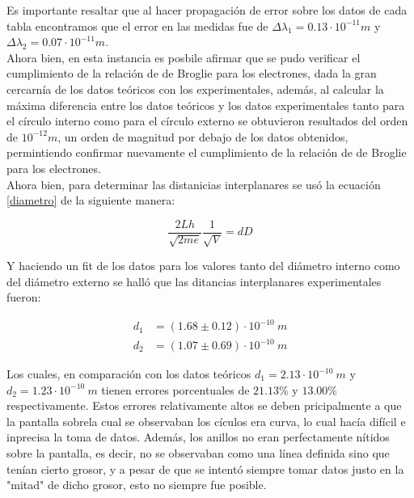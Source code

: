 \documentclass[prb,aps,twocolumn,preprintnumbers,amsmath,amssymb]{revtex4}
\begin{document}
Es importante resaltar que al hacer propagación de error \footnotemark[3] sobre los datos de cada tabla encontramos que el error en las medidas fue de $\Delta \lambda_{1} = 0.13  \cdot 10^{-11} m$ y $\Delta \lambda_{2} = 0.07 \cdot 10^{-11} m$.\\

Ahora bien, en esta instancia es posbile afirmar que se pudo verificar el cumplimiento de la relación de de Broglie para los electrones, dada la gran cercarnía de los datos teóricos con los experimentales, además, al calcular la máxima diferencia entre los datos teóricos y los datos experimentales tanto para el círculo interno como para el círculo externo se obtuvieron resultados del orden de $10^{-12} m$, un orden de magnitud por debajo de los datos obtenidos, permintiendo confirmar nuevamente el cumplimiento de la relación de de Broglie para los electrones.\\

Ahora bien, para determinar las distanicias interplanares se usó la ecuación \eqref{diametro} de la siguiente manera:

\begin{equation}
\label{diametro2}
\frac{2Lh}{\sqrt{2me}} \frac{1}{\sqrt{V}} = dD
\end{equation}

Y haciendo un fit de los datos para los valores tanto del diámetro interno como del diámetro externo se halló que las ditancias interplanares experimentales fueron:

\begin{equation}
\label{interplanar}
\begin{split}
d_{1} &= (1.68 \pm 0.12 )\cdot 10^{-10}\ m\\
d_{2} &= (1.07 \pm 0.69 )\cdot 10^{-10}\ m
\end{split}
\end{equation}

Los cuales, en comparación con los datos teóricos $d_{1} = 2.13 \cdot 10^{-10}\ m$ y $d_{2} = 1.23 \cdot 10^{-10}\ m$ tienen errores porcentuales de $21.13\%$ y $13.00\%$ respectivamente. Estos errores relativamente altos se deben pricipalmente a que la pantalla sobrela cual se observaban los cículos era curva, lo cual hacía difícil e inprecisa la toma de datos. Además, los anillos no eran perfectamente nítidos sobre la pantalla, es decir, no se observaban como una línea definida sino que tenían cierto grosor, y a pesar de que se intentó siempre tomar datos justo en la "mitad" de dicho grosor, esto no siempre fue posible.\\
\end{document}

